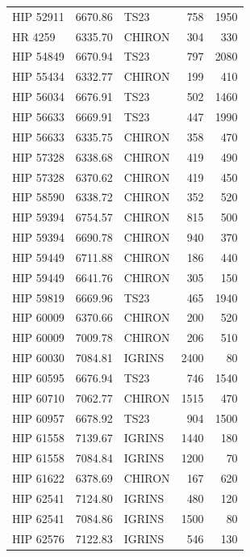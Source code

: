 {\begin{scriptsize}
\begin{longtable}{|l|rlrr|}
   HIP 52911 &  6670.86 &       TS23 &      758 &  1950 \\
     HR 4259 &  6335.70 &     CHIRON &      304 &   330 \\
   HIP 54849 &  6670.94 &       TS23 &      797 &  2080 \\
   HIP 55434 &  6332.77 &     CHIRON &      199 &   410 \\
   HIP 56034 &  6676.91 &       TS23 &      502 &  1460 \\
   HIP 56633 &  6669.91 &       TS23 &      447 &  1990 \\
   HIP 56633 &  6335.75 &     CHIRON &      358 &   470 \\
   HIP 57328 &  6338.68 &     CHIRON &      419 &   490 \\
   HIP 57328 &  6370.62 &     CHIRON &      419 &   450 \\
   HIP 58590 &  6338.72 &     CHIRON &      352 &   520 \\
   HIP 59394 &  6754.57 &     CHIRON &      815 &   500 \\
   HIP 59394 &  6690.78 &     CHIRON &      940 &   370 \\
   HIP 59449 &  6711.88 &     CHIRON &      186 &   440 \\
   HIP 59449 &  6641.76 &     CHIRON &      305 &   150 \\
   HIP 59819 &  6669.96 &       TS23 &      465 &  1940 \\
   HIP 60009 &  6370.66 &     CHIRON &      200 &   520 \\
   HIP 60009 &  7009.78 &     CHIRON &      206 &   510 \\
   HIP 60030 &  7084.81 &     IGRINS &     2400 &    80 \\
   HIP 60595 &  6676.94 &       TS23 &      746 &  1540 \\
   HIP 60710 &  7062.77 &     CHIRON &     1515 &   470 \\
   HIP 60957 &  6678.92 &       TS23 &      904 &  1500 \\
   HIP 61558 &  7139.67 &     IGRINS &     1440 &   180 \\
   HIP 61558 &  7084.84 &     IGRINS &     1200 &    70 \\
   HIP 61622 &  6378.69 &     CHIRON &      167 &   620 \\
   HIP 62541 &  7124.80 &     IGRINS &      480 &   120 \\
   HIP 62541 &  7084.86 &     IGRINS &     1500 &    80 \\
   HIP 62576 &  7122.83 &     IGRINS &      546 &   130 \\

\end{longtable}
\end{scriptsize}}
